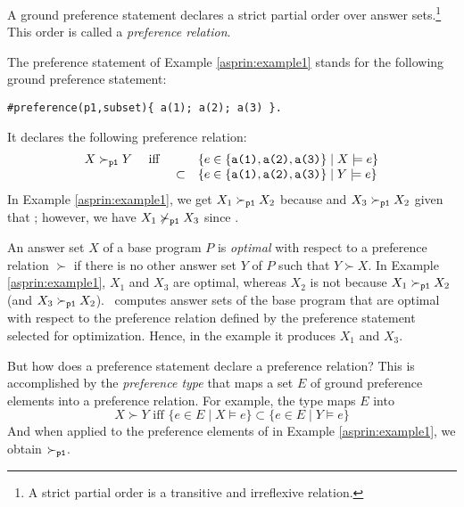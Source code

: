 A ground preference statement declares a 
strict partial order over answer sets.\footnote{A strict partial order is a transitive and irreflexive relation.}
This order is called a \emph{preference relation}.
\begin{example}
The preference statement of Example \ref{asprin:example1} stands for the following ground preference statement:
\begin{lstlisting}[numbers=none]
#preference(p1,subset){ a(1); a(2); a(3) }.
\end{lstlisting}
It declares the following preference relation:
\[
\begin{array}{cccl}
X \succ_{\texttt{p1}} Y & \text{ iff } &         & \{e\in \{\texttt{a(1)},\texttt{a(2)},\texttt{a(3)}\} \mid X\models e\} \\ 
                      &              & \subset & \{e\in \{\texttt{a(1)},\texttt{a(2)},\texttt{a(3)}\} \mid Y\models e\}
\end{array}
\]
In Example \ref{asprin:example1}, 
we get
$X_1\succ_{\texttt{p1}}X_2$ because 
and $X_3\succ_{\texttt{p1}}X_2$ given that ;
however, we have $X_1\not\succ_{\texttt{p1}}X_3$ since . 
\end{example}
An answer set $X$ of a base program $P$ is \emph{optimal} with respect to a preference relation $\succ$
if there is no other answer set $Y$ of $P$ such that $Y \succ X$.
In Example \ref{asprin:example1}, 
$X_1$ and $X_3$ are optimal,
whereas $X_2$ is not because $X_1 \succ_{\texttt{p1}} X_2$ (and $X_3 \succ_{\texttt{p1}} X_2$).
\asprin\ computes answer sets of the base program
that are optimal with respect to the preference relation 
defined by the preference statement selected for optimization.
Hence, in the example it produces $X_1$ and $X_3$.

But how does a preference statement declare a preference relation?
This is accomplished by the \emph{preference type}
that maps a set $E$ of ground preference elements into a preference relation.
For example, the type  maps $E$ into
\[
X \succ Y \text{ iff } \{e\in E\mid X\models e\}\subset\{e\in E\mid Y\models e\}
\]
And when applied to the preference elements of  in Example \ref{asprin:example1}, we obtain $\succ_{\texttt{p1}}$.

